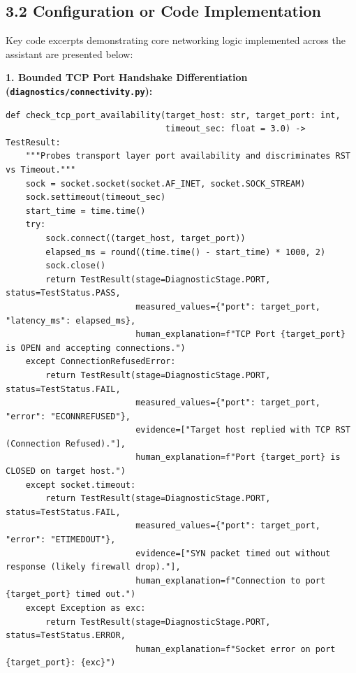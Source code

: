 \documentclass[
]{article}
\begin{document}
\subsection{3.2 Configuration or Code Implementation}\label{configuration-or-code-implementation}

Key code excerpts demonstrating core networking logic implemented across the assistant are presented below:

\vspace{0.2cm}
\textbf{1. Bounded TCP Port Handshake Differentiation (\texttt{diagnostics/connectivity.py}):}
\begin{verbatim}
def check_tcp_port_availability(target_host: str, target_port: int, 
                                timeout_sec: float = 3.0) -> TestResult:
    """Probes transport layer port availability and discriminates RST vs Timeout."""
    sock = socket.socket(socket.AF_INET, socket.SOCK_STREAM)
    sock.settimeout(timeout_sec)
    start_time = time.time()
    try:
        sock.connect((target_host, target_port))
        elapsed_ms = round((time.time() - start_time) * 1000, 2)
        sock.close()
        return TestResult(stage=DiagnosticStage.PORT, status=TestStatus.PASS,
                          measured_values={"port": target_port, "latency_ms": elapsed_ms},
                          human_explanation=f"TCP Port {target_port} is OPEN and accepting connections.")
    except ConnectionRefusedError:
        return TestResult(stage=DiagnosticStage.PORT, status=TestStatus.FAIL,
                          measured_values={"port": target_port, "error": "ECONNREFUSED"},
                          evidence=["Target host replied with TCP RST (Connection Refused)."],
                          human_explanation=f"Port {target_port} is CLOSED on target host.")
    except socket.timeout:
        return TestResult(stage=DiagnosticStage.PORT, status=TestStatus.FAIL,
                          measured_values={"port": target_port, "error": "ETIMEDOUT"},
                          evidence=["SYN packet timed out without response (likely firewall drop)."],
                          human_explanation=f"Connection to port {target_port} timed out.")
    except Exception as exc:
        return TestResult(stage=DiagnosticStage.PORT, status=TestStatus.ERROR,
                          human_explanation=f"Socket error on port {target_port}: {exc}")
\end{verbatim}
\end{document}

